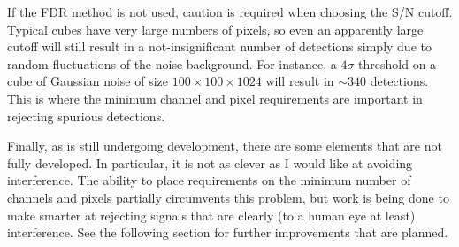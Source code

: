 If the FDR method is not used, caution is required when choosing the
S/N cutoff. Typical cubes have very large numbers of pixels, so even
an apparently large cutoff will still result in a not-insignificant
number of detections simply due to random fluctuations of the noise
background. For instance, a $4\sigma$ threshold on a cube of Gaussian
noise of size $100\times100\times1024$ will result in $\sim340$
detections. This is where the minimum channel and pixel requirements
are important in rejecting spurious detections.

Finally, as \duchamp is still undergoing development, there are some
elements that are not fully developed. In particular, it is not as
clever as I would like at avoiding interference. The ability to place
requirements on the minimum number of channels and pixels partially
circumvents this problem, but work is being done to make \duchamp
smarter at rejecting signals that are clearly (to a human eye at
least) interference. See the following section for further
improvements that are planned.
